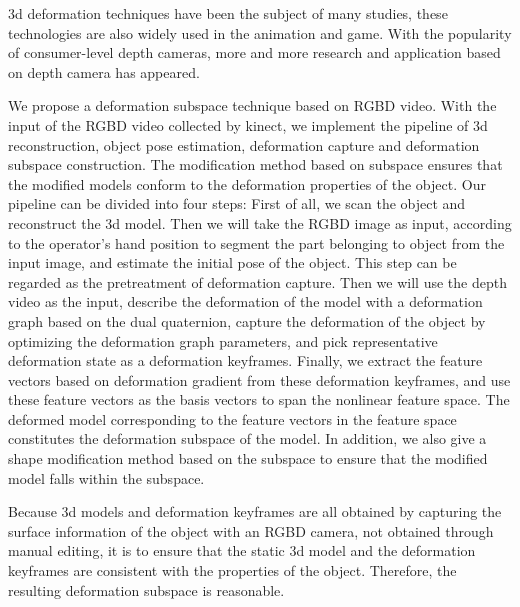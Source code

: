 \begin{englishabstract}

3d deformation techniques have been the subject of many studies,
these technologies are also widely used in the animation and game.
With the popularity of consumer-level depth cameras, 
more and more research and application based on depth camera has appeared.

We propose a deformation subspace technique based on RGBD video.
With the input of the RGBD video collected by kinect, 
we implement the pipeline of 3d reconstruction,
 object pose estimation, deformation capture and deformation subspace construction.
 The modification method based on subspace ensures that the modified models conform to the deformation properties of the object.
 Our pipeline can be divided into four steps:
 First of all, we scan the object and reconstruct the 3d model.
 Then we will take the RGBD image as input, 
 according to the operator's hand position to segment the part belonging to object from the input image, 
 and estimate the initial pose of the object.
 This step can be regarded as the pretreatment of deformation capture.
 Then we will use the depth video as the input, 
 describe the deformation of the model with a deformation graph based on the dual quaternion, 
 capture the deformation of the object by optimizing the deformation graph parameters, 
 and pick representative deformation state as a deformation keyframes.
 Finally, we extract the feature vectors based on deformation gradient from these deformation keyframes, 
 and use these feature vectors as the basis vectors to span the nonlinear feature space. 
 The deformed model corresponding to the feature vectors in the feature space constitutes the deformation subspace of the model.
 In addition, 
 we also give a shape modification method based on the subspace to ensure that the modified model falls within the subspace.

 Because 3d models and deformation keyframes are all obtained by capturing the surface information of the object with an RGBD camera, 
 not obtained through manual editing, 
 it is to ensure that the static 3d model and the deformation keyframes are consistent with the properties of the object. 
 Therefore, the resulting deformation subspace is reasonable.


\end{englishabstract}
